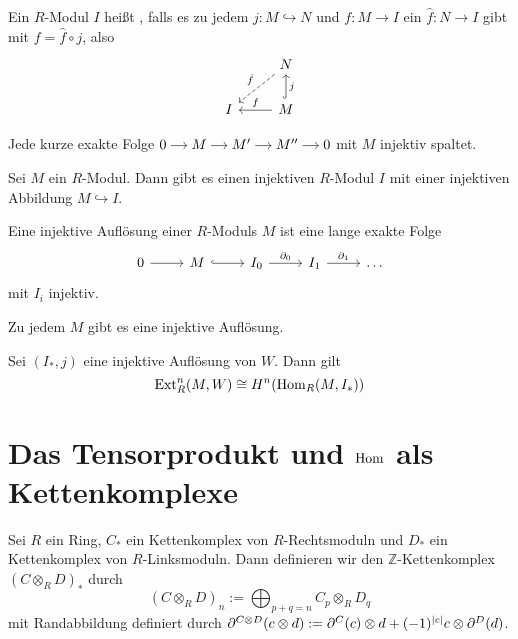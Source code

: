 \begin{definition}
	Ein $R$-Modul $I$ heißt , falls es zu jedem $j \colon M \hookrightarrow N$ und $f \colon M \to I$ ein $\hat{f} \colon N \to I$ gibt mit $f = \hat{f} \circ j$, also
	\[
		\begin{tikzcd}
			\mbox{ } & N \dlar[dashed,"\hat{f}"'] \\
			I & M \lar["f"'] \uar["j"',hook]
		\end{tikzcd}
	\]
\end{definition}

\begin{bemerkung}
	Jede kurze exakte Folge \(
		\begin{tikzcd}[cramped,sep=small]
			0 \rar & M \rar & M' \rar & M'' \rar & 0
		\end{tikzcd}
	\)
	mit $M$ injektiv spaltet.
\end{bemerkung}

\begin{satz}[{name=[Existenz von injektiven Moduln]}]
	Sei $M$ ein $R$-Modul.
	Dann gibt es einen injektiven $R$-Modul $I$ mit einer injektiven Abbildung $M \hookrightarrow I$.
\end{satz}

\begin{definition}
	Eine injektive Auflösung einer $R$-Moduls $M$ ist eine lange exakte Folge 
	\[
		\begin{tikzcd}
			0 \rar & M \rar[hook] & I_0 \rar["\partial_0"] & I_1 \rar["\partial_1"] & \ldots 
		\end{tikzcd}
	\]
	mit $I_i$ injektiv.
\end{definition}

\begin{korollarB}
	Zu jedem $M$ gibt es eine injektive Auflösung.
\end{korollarB}

\begin{bemerkung}
	Sei $(I_*,j)$ eine injektive Auflösung von $W$. 
	Dann gilt
	\[
		\Ext_R^n(M,W) \cong H^n \enbrace*{\Hom_R(M,I_*)}
	\]
\end{bemerkung}
\newpage

\section{Das Tensorprodukt und $\Hom$ als Kettenkomplexe} %
\label{sec:das_tensorprodukt_und_hom_als_kettenkomplexe}

\begin{definition}
	Sei $R$ ein Ring, $C_*$ ein Kettenkomplex von $R$-Rechtsmoduln und $D_*$ ein Kettenkomplex von $R$-Linksmoduln.
	Dann definieren wir den $\mathbb{Z}$-Kettenkomplex $(C \otimes_R D)_*$ durch 
	\[
		(C \otimes_R D)_n := \bigoplus_{p+q=n} C_p \otimes_R D_q
	\]
	mit Randabbildung definiert durch
	\(
		\partial^{C \otimes D} (c \otimes d) := \partial^C(c) \otimes d + (-1)^{\abs*{c}} c \otimes \partial^D(d)
	\).
\end{definition}

